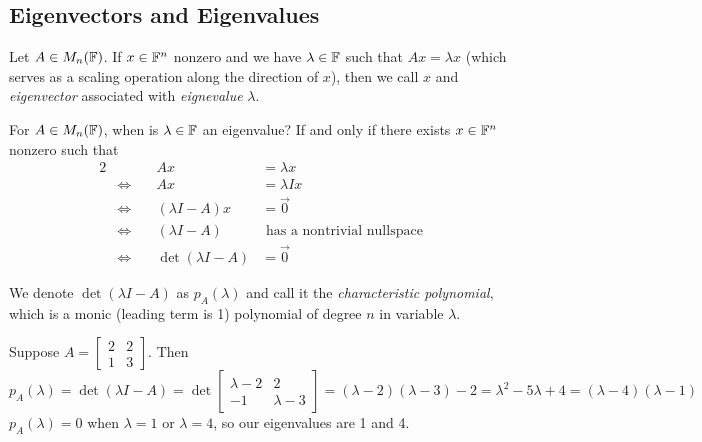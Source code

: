 \subsection{Eigenvectors and Eigenvalues}
\begin{definition}
\label{def:eigenvector-eigenvalue}
Let $A \in M_n(\mathbb F)$. If $x \in \mathbb F^n$ nonzero and we have $\lambda \in \mathbb F$ such that $Ax = \lambda x$ (which serves as a scaling operation along the direction of $x$), then we call $x$ and \textit{eigenvector} associated with \textit{eignevalue} $\lambda$.
\end{definition}

\begin{note*}
For $A \in M_n(\mathbb F)$, when is $\lambda \in \mathbb F$ an eigenvalue? If and only if there exists $x \in \mathbb F^n$ nonzero such that
\begin{alignat*}{2}
&& Ax &= \lambda x \\
&\Longleftrightarrow \quad &  Ax &= \lambda Ix \\
&\Longleftrightarrow \quad & (\lambda I - A)x &= \vec{0} \\
&\Longleftrightarrow \quad & (\lambda I - A) &\text{ has a nontrivial nullspace} \\
&\Longleftrightarrow \quad & \det(\lambda I - A) &= \vec{0}
\end{alignat*}
\end{note*}

\begin{definition}
\label{def:char-poly}
We denote $\det(\lambda I - A)$ as $p_A(\lambda)$ and call it the \textit{characteristic polynomial}, which is a monic (leading term is 1) polynomial of degree $n$ in variable $\lambda$.
\end{definition}

\begin{example}
Suppose $A = \begin{bmatrix} 2 & 2 \\ 1 & 3\end{bmatrix}$. Then
$$
p_A(\lambda) = \det(\lambda I - A) = \det \begin{bmatrix} \lambda - 2 & 2 \\ -1 & \lambda - 3 \end{bmatrix} = (\lambda-2)(\lambda-3) - 2 = \lambda^2 - 5 \lambda + 4 = (\lambda-4)(\lambda-1)
$$
$p_A(\lambda) = 0$ when $\lambda = 1$ or $\lambda = 4$, so our eigenvalues are 1 and 4.
\end{example}

